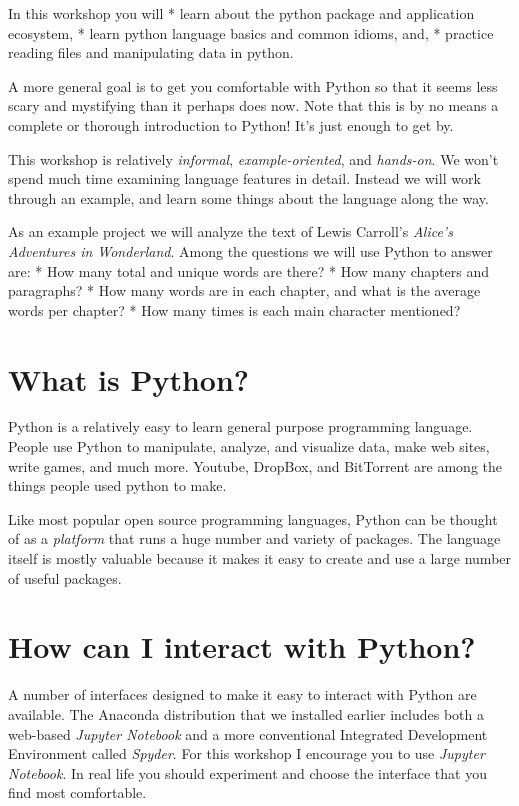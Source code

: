 \documentclass[]{book}
\begin{document}
In this workshop you will * learn about the python package and
application ecosystem, * learn python language basics and common idioms,
and, * practice reading files and manipulating data in python.

A more general goal is to get you comfortable with Python so that it
seems less scary and mystifying than it perhaps does now. Note that this
is by no means a complete or thorough introduction to Python! It's just
enough to get by.

This workshop is relatively \emph{informal}, \emph{example-oriented},
and \emph{hands-on}. We won't spend much time examining language
features in detail. Instead we will work through an example, and learn
some things about the language along the way.

As an example project we will analyze the text of Lewis Carroll's
\emph{Alice's Adventures in Wonderland}. Among the questions we will use
Python to answer are: * How many total and unique words are there? * How
many chapters and paragraphs? * How many words are in each chapter, and
what is the average words per chapter? * How many times is each main
character mentioned?

\section{What is Python?}\label{what-is-python}

Python is a relatively easy to learn general purpose programming
language. People use Python to manipulate, analyze, and visualize data,
make web sites, write games, and much more. Youtube, DropBox, and
BitTorrent are among the things people used python to make.

Like most popular open source programming languages, Python can be
thought of as a \emph{platform} that runs a huge number and variety of
packages. The language itself is mostly valuable because it makes it
easy to create and use a large number of useful packages.

\section{How can I interact with
Python?}\label{how-can-i-interact-with-python}

A number of interfaces designed to make it easy to interact with Python
are available. The Anaconda distribution that we installed earlier
includes both a web-based \emph{Jupyter Notebook} and a more
conventional Integrated Development Environment called \emph{Spyder}.
For this workshop I encourage you to use \emph{Jupyter Notebook}. In
real life you should experiment and choose the interface that you find
most comfortable.
\end{document}
